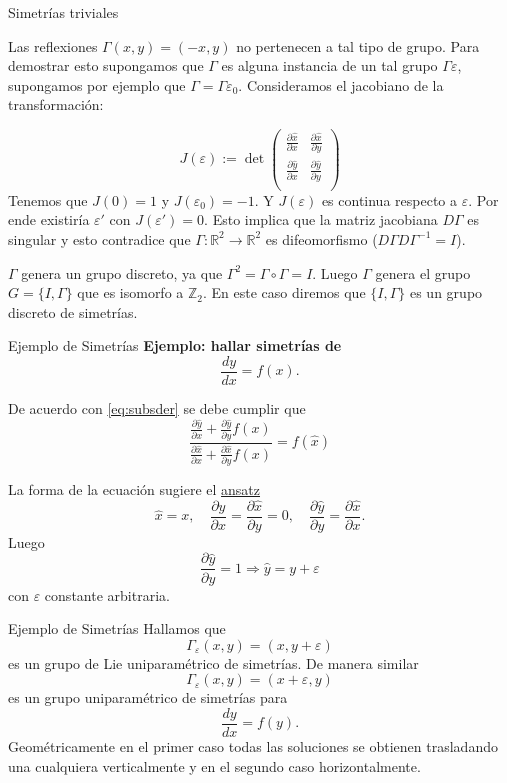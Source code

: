 \documentclass[handout,hyperref={colorlinks=true}]{beamer}
\newcommand{\rr}{\mathbb{R}}
\renewcommand{\emph}[1]{\textcolor[rgb]{1,0,0}{#1}}
\renewcommand{\epsilon}{\varepsilon}
\newcommand{\nl}{\onslide<+-> }
\begin{document}
\begin{frame}{Simetrías triviales}


\nl Las reflexiones $\Gamma(x,y)=(-x,y)$  no pertenecen a tal tipo de  grupo. Para demostrar esto supongamos que  $\Gamma$ es alguna instancia de un tal grupo $\Gamma{\epsilon}$, supongamos por ejemplo que $\Gamma=\Gamma{\epsilon_0}$.  Consideramos el jacobiano de la transformación:

\[J(\epsilon):=\det\begin{pmatrix} \frac{\partial\hat{x}}{\partial x}&  \frac{\partial\hat{x}}{\partial y}\\
 \frac{\partial\hat{y}}{\partial x} &  \frac{\partial\hat{y}}{\partial y}\\
\end{pmatrix}
\]
\nl Tenemos que $J(0)=1$ y $J(\epsilon_0)=-1$. Y $J(\epsilon)$ es continua respecto a $\epsilon$. Por ende existiría $\epsilon'$ con $J(\epsilon')=0$. Esto implica que la matriz jacobiana $D\Gamma$ es singular y esto contradice que $\Gamma:\rr^2\to \rr^2$ es difeomorfismo ($D\Gamma D\Gamma^{-1}=I$).



\nl $\Gamma$  genera un grupo discreto, ya que $\Gamma^2=\Gamma\circ \Gamma=I$. Luego $\Gamma$ genera el grupo $G=\{I,\Gamma\}$ que es isomorfo a $\mathbb{Z}_2$. En este caso diremos que    $\{I,\Gamma\}$ es un \emph{grupo discreto} de simetrías. 
\end{frame}



 \begin{frame}{Ejemplo de Simetrías}
 \textbf{Ejemplo: hallar simetrías de }
\[\frac{dy}{dx}=f(x).\]

De acuerdo con \eqref{eq:subsder} se debe cumplir que 
 \[\frac{\frac{\partial\hat{y}}{\partial x}+\frac{\partial\hat{y}}{\partial y}f(x)}{\frac{\partial\hat{x}}{\partial x}+\frac{\partial\hat{x}}{\partial y}f(x)}=f(\hat{x})\]

La forma de la ecuación sugiere el  \href{http://es.wikipedia.org/wiki/Ansatz}{ansatz}
   \[\boxed{\hat{x}=x},\quad \frac{\partial\hat{y}}{\partial x}=\frac{\partial\hat{x}}{\partial y}=0,\quad
   \frac{\partial\hat{y}}{\partial y}=\frac{\partial\hat{x}}{\partial x}. \]
 Luego 
\[\frac{\partial\hat{y}}{\partial y}=1\Rightarrow \boxed{\hat{y}=y+\epsilon} \]
con $\epsilon$ constante arbitraria.
 \end{frame}

\begin{frame}{Ejemplo de Simetrías}
Hallamos que 
\[\Gamma_{\epsilon}(x,y)=(x,y+\epsilon)\]
es un grupo de Lie uniparamétrico de simetrías. De manera similar
\[\Gamma_{\epsilon}(x,y)=(x+\epsilon,y)\]
es un grupo uniparamétrico de simetrías para 
\[\frac{dy}{dx}=f(y).\]
Geométricamente en el primer caso todas las soluciones se obtienen trasladando una cualquiera verticalmente y en el segundo caso horizontalmente.

\end{frame}
\end{document}
